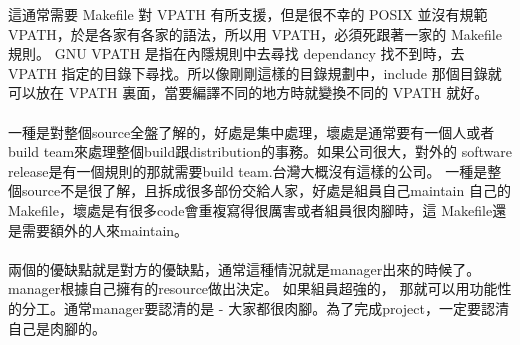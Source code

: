     這通常需要 Makefile 對 VPATH 有所支援，但是很不幸的 POSIX 並沒有規範
    VPATH，於是各家有各家的語法，所以用 VPATH，必須死跟著一家的 Makefile 
    規則。 GNU VPATH 是指在內隱規則中去尋找 dependancy 找不到時，去 VPATH 
    指定的目錄下尋找。所以像剛剛這樣的目錄規劃中，include 那個目錄就可以放在
    VPATH 裏面，當要編譯不同的地方時就變換不同的 VPATH 就好。
    \\\\ 
    一種是對整個source全盤了解的，好處是集中處理，壞處是通常要有一個人或者
    build team來處理整個build跟distribution的事務。如果公司很大，對外的
    software release是有一個規則的那就需要build team.台灣大概沒有這樣的公司。
    一種是整個source不是很了解，且拆成很多部份交給人家，好處是組員自己maintain
    自己的Makefile，壞處是有很多code會重複寫得很厲害或者組員很肉腳時，這
    Makefile還是需要額外的人來maintain。
    \\\\
    兩個的優缺點就是對方的優缺點，通常這種情況就是manager出來的時候了。
    manager根據自己擁有的resource做出決定。 如果組員超強的，
    那就可以用功能性的分工。通常manager要認清的是 - 
    大家都很肉腳。為了完成project，一定要認清自己是肉腳的。

